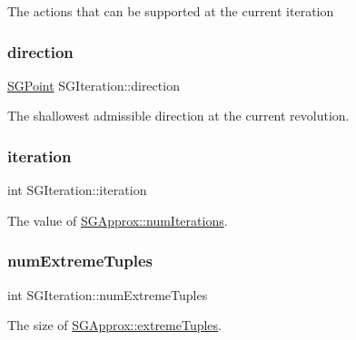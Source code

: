 The actions that can be supported at the current iteration \mbox{\label{classSGIteration_ac35e7e3049cd60c695a366cb8f75db37}} 
\subsubsection{\texorpdfstring{direction}{direction}}
{\footnotesize\ttfamily \hyperlink{classSGPoint}{S\+G\+Point} S\+G\+Iteration\+::direction\hspace{0.3cm}{\ttfamily [private]}}

The shallowest admissible direction at the current revolution. \mbox{\label{classSGIteration_a44a4f9e3cb074181292ae816b2c28d9e}} 
\subsubsection{\texorpdfstring{iteration}{iteration}}
{\footnotesize\ttfamily int S\+G\+Iteration\+::iteration\hspace{0.3cm}{\ttfamily [private]}}

The value of \hyperlink{classSGApprox_a7ab53424f5933726a15001ff2885a4a9}{S\+G\+Approx\+::num\+Iterations}. \mbox{\label{classSGIteration_a14ecfb94b3111911d9b0ef545f72e88d}} 
\subsubsection{\texorpdfstring{num\+Extreme\+Tuples}{numExtremeTuples}}
{\footnotesize\ttfamily int S\+G\+Iteration\+::num\+Extreme\+Tuples\hspace{0.3cm}{\ttfamily [private]}}

The size of \hyperlink{classSGApprox_ab0e2c4678401f806922ac64667ad5ff6}{S\+G\+Approx\+::extreme\+Tuples}. \mbox{\label{classSGIteration_abdae7d336968af3515e7d9590cbcc46d}} 
